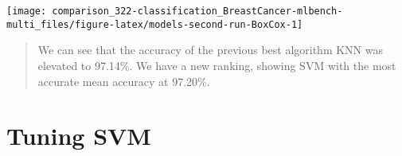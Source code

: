 \documentclass[]{book}
\begin{document}
\begin{center}\texttt{[image: comparison\_322-classification\_BreastCancer-mlbench-multi\_files/figure-latex/models-second-run-BoxCox-1]} \end{center}

\begin{quote}
We can see that the accuracy of the previous best algorithm KNN was elevated to 97.14\%. We have a new ranking, showing SVM with the most accurate mean accuracy at 97.20\%.
\end{quote}

\hypertarget{tuning-svm}{%
\section{Tuning SVM}\label{tuning-svm}}
\end{document}
